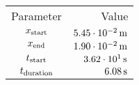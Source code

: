 \begin{tabular}{cr}
    \toprule
    Parameter & Value \\ \otoprule
    $x_{\textup{start}}$    & $\unit[5.45 \cdot 10^{-2}]{m}$ \\
    $x_{\textup{end}}$      & $\unit[1.90 \cdot 10^{-2}]{m}$ \\
    $t_{\textup{start}}$    & $\unit[3.62 \cdot 10^{1}]{s}$ \\
    $t_{\textup{duration}}$ & $\unit[6.08]{s}$ \\
    \bottomrule
\end{tabular}
